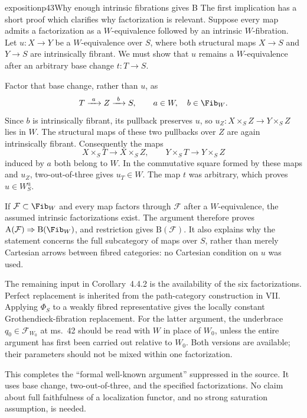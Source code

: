 \begin{dcomment}{exposition}{p43}{Why enough intrinsic fibrations gives B}
The first implication has a short proof which clarifies why factorization is relevant. Suppose every map admits a factorization as a $W$-equivalence followed by an intrinsic $W$-fibration. Let $u:X\to Y$ be a $W$-equivalence over $S$, where both structural maps $X\to S$ and $Y\to S$ are intrinsically fibrant. We must show that $u$ remains a $W$-equivalence after an arbitrary base change $t:T\to S$.

Factor that base change, rather than $u$, as
\[
 T\xrightarrow{\ a\ }Z\xrightarrow{\ b\ }S,
 \qquad a\in W,\quad b\in\Fib_W.
\]
Since $b$ is intrinsically fibrant, its pullback preserves $u$, so $u_Z:X\times_SZ\to Y\times_SZ$ lies in $W$. The structural maps of these two pullbacks over $Z$ are again intrinsically fibrant. Consequently the maps
\[
 X\times_ST\longrightarrow X\times_SZ,
 \qquad Y\times_ST\longrightarrow Y\times_SZ
\]
induced by $a$ both belong to $W$. In the commutative square formed by these maps and $u_Z$, two-out-of-three gives $u_T\in W$. The map $t$ was arbitrary, which proves $u\in W_S^{\mathrm u}$.

If $\mathcal F\subset\Fib_W$ and every map factors through $\mathcal F$ after a $W$-equivalence, the assumed intrinsic factorizations exist. The argument therefore proves $\mathrm A(\mathcal F)\Rightarrow\mathrm B(\Fib_W)$, and restriction gives $\mathrm B(\mathcal F)$. It also explains why the statement concerns the full subcategory of maps over $S$, rather than merely Cartesian arrows between fibred categories: no Cartesian condition on $u$ was used.

The remaining input in Corollary~4.4.2 is the availability of the six factorizations. Perfect replacement is inherited from the path-category construction in VII. Applying $\Phi_S$ to a weakly fibred representative gives the locally constant Grothendieck-fibration replacement. For the latter argument, the underbrace $q_0\in\mathcal F_{W_0}$ at ms.~42 should be read with $W$ in place of $W_0$, unless the entire argument has first been carried out relative to $W_0$. Both versions are available; their parameters should not be mixed within one factorization.

This completes the ``formal well-known argument'' suppressed in the source. It uses base change, two-out-of-three, and the specified factorizations. No claim about full faithfulness of a localization functor, and no strong saturation assumption, is needed.
\end{dcomment}

